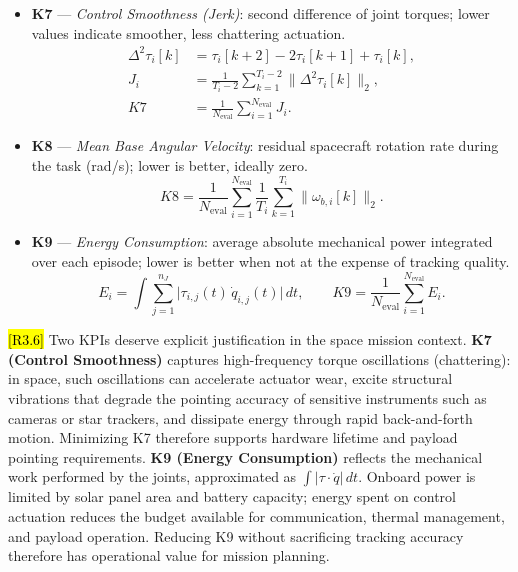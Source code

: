 \documentclass{ieeeaccess}
\newcommand{\hlthree}[1]{{\sethlcolor{rthree}\hl{#1}}}
\newenvironment{rthreehl}
  {\def\FrameCommand{\colorbox{rthree}}\MakeFramed{\advance\hsize-\width\FrameRestore}}
  {\endMakeFramed}
\begin{document}
\begin{itemize}
  \item \textbf{K7} --- \emph{Control Smoothness (Jerk)}: second difference of joint torques; lower values indicate smoother, less chattering actuation.
  \begin{equation*}
  \begin{aligned}
  \Delta^2\tau_i[k] &= \tau_i[k+2]-2\tau_i[k+1]+\tau_i[k],\\
  J_i &= \frac{1}{T_i-2}\sum_{k=1}^{T_i-2}\|\Delta^2\tau_i[k]\|_2,\\
  K7 &= \frac{1}{N_{\text{eval}}}\sum_{i=1}^{N_{\text{eval}}}J_i.
  \end{aligned}
  \end{equation*}

  \item \textbf{K8} --- \emph{Mean Base Angular Velocity}: residual spacecraft rotation rate during the task (rad/s); lower is better, ideally zero.
  \begin{equation*}
  K8=\frac{1}{N_{\text{eval}}}\sum_{i=1}^{N_{\text{eval}}}\frac{1}{T_i}\sum_{k=1}^{T_i}\|\omega_{b,i}[k]\|_2.
  \end{equation*}

  \item \textbf{K9} --- \emph{Energy Consumption}: average absolute mechanical power integrated over each episode; lower is better when not at the expense of tracking quality.
  \begin{equation*}
  E_i=\int\sum_{j=1}^{n_J}\big|\tau_{i,j}(t)\,\dot q_{i,j}(t)\big|\,dt, \qquad
  K9=\frac{1}{N_{\text{eval}}}\sum_{i=1}^{N_{\text{eval}}} E_i.
  \end{equation*}
\end{itemize}


\begin{rthreehl}
\hlthree{[R3.6]} Two KPIs deserve explicit justification in the space mission context. \textbf{K7 (Control Smoothness)} captures high-frequency torque oscillations (chattering): in space, such oscillations can accelerate actuator wear, excite structural vibrations that degrade the pointing accuracy of sensitive instruments such as cameras or star trackers, and dissipate energy through rapid back-and-forth motion. Minimizing K7 therefore supports hardware lifetime and payload pointing requirements. \textbf{K9 (Energy Consumption)} reflects the mechanical work performed by the joints, approximated as $\int |\tau \cdot \dot{q}|\,dt$. Onboard power is limited by solar panel area and battery capacity; energy spent on control actuation reduces the budget available for communication, thermal management, and payload operation. Reducing K9 without sacrificing tracking accuracy therefore has operational value for mission planning.
\end{rthreehl}
\end{document}
